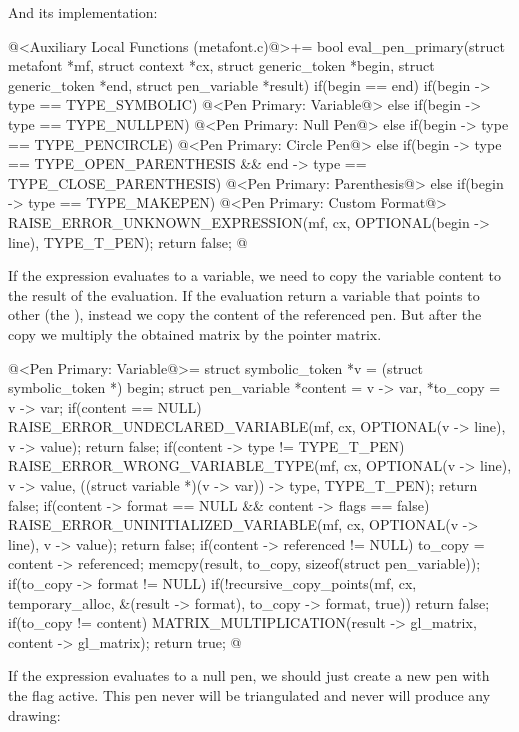 {{{{{And its implementation:

\iniciocodigo
@<Auxiliary Local Functions (metafont.c)@>+=
bool eval_pen_primary(struct metafont *mf, struct context *cx,
                      struct generic_token *begin,
                      struct generic_token *end,
                      struct pen_variable *result){
  if(begin == end){
    if(begin -> type == TYPE_SYMBOLIC){
      @<Pen Primary: Variable@>
    }
    else if(begin -> type == TYPE_NULLPEN){
      @<Pen Primary: Null Pen@>
    }
    else if(begin -> type == TYPE_PENCIRCLE){
      @<Pen Primary: Circle Pen@>
    }
  }
  else{
    if(begin -> type == TYPE_OPEN_PARENTHESIS &&
      end -> type == TYPE_CLOSE_PARENTHESIS){
      @<Pen Primary: Parenthesis@>
    }
    else if(begin -> type == TYPE_MAKEPEN){
      @<Pen Primary: Custom Format@>
    }
  }
  RAISE_ERROR_UNKNOWN_EXPRESSION(mf, cx, OPTIONAL(begin -> line),
                                 TYPE_T_PEN);
  return false;
}
@
\fimcodigo

If the expression evaluates to a variable, we need to copy the
variable content to the result of the evaluation. If the evaluation
return a variable that points to other (the ),
instead we copy the content of the referenced pen. But after the copy
we multiply the obtained matrix by the pointer matrix.

\iniciocodigo
@<Pen Primary: Variable@>=
struct symbolic_token *v = (struct symbolic_token *) begin;
struct pen_variable *content = v -> var, *to_copy = v -> var;
if(content == NULL){
  RAISE_ERROR_UNDECLARED_VARIABLE(mf, cx, OPTIONAL(v -> line), v -> value);
  return false;
}
if(content -> type != TYPE_T_PEN){
  RAISE_ERROR_WRONG_VARIABLE_TYPE(mf, cx, OPTIONAL(v -> line), v -> value, 
                                 ((struct variable *)(v -> var)) -> type,
                                 TYPE_T_PEN);
  return false;
}
if(content -> format == NULL && content -> flags == false){
  RAISE_ERROR_UNINITIALIZED_VARIABLE(mf, cx, OPTIONAL(v -> line), v -> value);
  return false;
}
if(content -> referenced != NULL)
  to_copy = content -> referenced;
memcpy(result, to_copy, sizeof(struct pen_variable));
if(to_copy -> format != NULL)
  if(!recursive_copy_points(mf, cx, temporary_alloc, &(result -> format),
                            to_copy -> format, true))
    return false;
if(to_copy != content)
  MATRIX_MULTIPLICATION(result -> gl_matrix, content -> gl_matrix);
return true;
@
\fimcodigo

If the expression evaluates to a null pen, we should just create a new
pen with the flag  active. This pen never will
be triangulated and never will produce any drawing:

}}}}}
